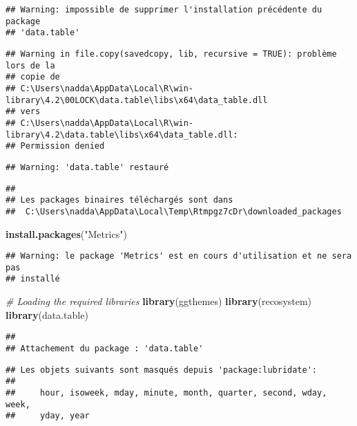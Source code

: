 \documentclass[
]{article}
\newenvironment{Shaded}{\begin{snugshade}}{\end{snugshade}}
\newcommand{\CommentTok}[1]{\textcolor[rgb]{0.56,0.35,0.01}{\textit{#1}}}
\newcommand{\FunctionTok}[1]{\textcolor[rgb]{0.13,0.29,0.53}{\textbf{#1}}}
\newcommand{\NormalTok}[1]{#1}
\newcommand{\StringTok}[1]{\textcolor[rgb]{0.31,0.60,0.02}{#1}}
\begin{document}
\begin{verbatim}
## Warning: impossible de supprimer l'installation précédente du package
## 'data.table'
\end{verbatim}

\begin{verbatim}
## Warning in file.copy(savedcopy, lib, recursive = TRUE): problème lors de la
## copie de
## C:\Users\nadda\AppData\Local\R\win-library\4.2\00LOCK\data.table\libs\x64\data_table.dll
## vers
## C:\Users\nadda\AppData\Local\R\win-library\4.2\data.table\libs\x64\data_table.dll:
## Permission denied
\end{verbatim}

\begin{verbatim}
## Warning: 'data.table' restauré
\end{verbatim}

\begin{verbatim}
## 
## Les packages binaires téléchargés sont dans
##  C:\Users\nadda\AppData\Local\Temp\Rtmpgz7cDr\downloaded_packages
\end{verbatim}

\begin{Shaded}
\begin{Highlighting}[]
\FunctionTok{install.packages}\NormalTok{(}\StringTok{"Metrics"}\NormalTok{)}
\end{Highlighting}
\end{Shaded}

\begin{verbatim}
## Warning: le package 'Metrics' est en cours d'utilisation et ne sera pas
## installé
\end{verbatim}

\begin{Shaded}
\begin{Highlighting}[]
\CommentTok{\# Loading the required libraries}
\FunctionTok{library}\NormalTok{(ggthemes)}
\FunctionTok{library}\NormalTok{(recosystem)}
\FunctionTok{library}\NormalTok{(data.table)}
\end{Highlighting}
\end{Shaded}

\begin{verbatim}
## 
## Attachement du package : 'data.table'
\end{verbatim}

\begin{verbatim}
## Les objets suivants sont masqués depuis 'package:lubridate':
## 
##     hour, isoweek, mday, minute, month, quarter, second, wday, week,
##     yday, year
\end{verbatim}
\end{document}
